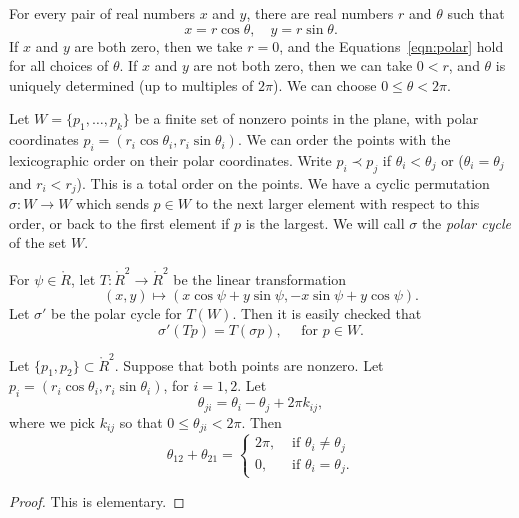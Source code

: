 For every pair of real numbers $x$ and $y$,  there are real numbers
$r$ and $\theta$ such that
    \begin{equation}\label{eqn:polar}
    x = r\cos\theta,\quad y = r\sin\theta.
    \end{equation}
If $x$ and $y$ are both zero, then we take $r=0$, and the
Equations~\ref{eqn:polar} hold for all choices of $\theta$. If $x$
and $y$ are not both zero, then we can take $0<r$, and $\theta$ is
uniquely determined (up to multiples of $2\pi$).  We can choose
$0\le\theta < 2\pi$.

Let $W=\{p_1,\ldots,p_k\}$ be a finite set of
nonzero points in the plane, with
polar coordinates $p_i = (r_i\cos\theta_i,r_i\sin\theta_i)$.
We can order the points with the lexicographic order on their
polar coordinates.  Write $p_i \prec p_j$ if
$\theta_i < \theta_j$ or ($\theta_i=\theta_j$ and $r_i<r_j$).
This is a total order on the points.
We have a cyclic permutation $\sigma:W\to W$ which sends
$p\in W$ to the next larger element with respect to this order,
or back to the first element if $p$ is the largest.
We will call $\sigma$ the {\it polar cycle} 
of the set $W$.




For $\psi\in\ring{R}$, let $T:\ring{R}^2\to\ring{R}^2$ be the
linear transformation
   $$
   (x,y) \mapsto  (x\cos\psi + y\sin\psi,-x\sin\psi+y\cos\psi).
   $$
Let $\sigma'$ be the polar cycle for $T(W)$.  Then it is easily
checked that
$$
   \sigma'(T p) = T (\sigma p),\quad \text{ for } p\in W. 
$$

\begin{lemma}\label{lemma:polar2} 
Let $\{p_1,p_2\}\subset \ring{R}^2$.  Suppose
that both points are nonzero.  Let 
$p_i =(r_i\cos\theta_i,r_i\sin\theta_i)$, for $i=1,2$.
Let $$\theta_{ji} = \theta_i - \theta_j + 2\pi k_{ij},$$
where we pick $k_{ij}$ so that $0\le \theta_{ji}< 2\pi$.
Then 
$$
  \theta_{12} + \theta_{21} = \begin{cases}
    2\pi, & \text{ if }\theta_i\ne\theta_j\\
    0,    & \text{ if }\theta_i=\theta_j.
    \end{cases}
$$
\end{lemma}

\begin{proof} This is elementary.
\end{proof}



